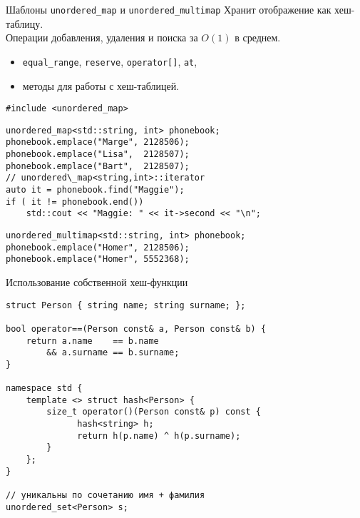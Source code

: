 \documentclass{beamer}
\begin{document}
\begin{frame}[fragile]{Шаблоны {\tt unordered\_map} и {\tt unordered\_multimap}}
Хранит отображение как хеш-таблицу.\\ 
Операции добавления, удаления и поиска за $O(1)$ в среднем.

\begin{itemize}
	\item {\tt equal\_range}, {\tt reserve}, {\tt operator[]}, {\tt at},
	\item методы для работы с хеш-таблицей.
\end{itemize}\vspace{-1mm}
\begin{lstlisting}
#include <unordered_map>
\end{lstlisting}\vspace{-1mm}
\begin{lstlisting}
unordered_map<std::string, int> phonebook;
phonebook.emplace("Marge", 2128506);
phonebook.emplace("Lisa",  2128507);
phonebook.emplace("Bart",  2128507);
// unordered\_map<string,int>::iterator
auto it = phonebook.find("Maggie");
if ( it != phonebook.end())
    std::cout << "Maggie: " << it->second << "\n";
\end{lstlisting}\vspace{-1mm}
\begin{lstlisting}
unordered_multimap<std::string, int> phonebook;
phonebook.emplace("Homer", 2128506);
phonebook.emplace("Homer", 5552368);
\end{lstlisting}
\end{frame}

\begin{frame}[fragile]{Использование собственной хеш-функции}
\begin{lstlisting}
struct Person { string name; string surname; };

bool operator==(Person const& a, Person const& b) { 		
    return a.name    == b.name 
        && a.surname == b.surname; 
}

namespace std {
    template <> struct hash<Person> {
        size_t operator()(Person const& p) const {
              hash<string> h;
              return h(p.name) ^ h(p.surname);
        }
    };
}

// уникальны по сочетанию имя + фамилия
unordered_set<Person> s;
\end{lstlisting}
\end{frame}
\end{document}
